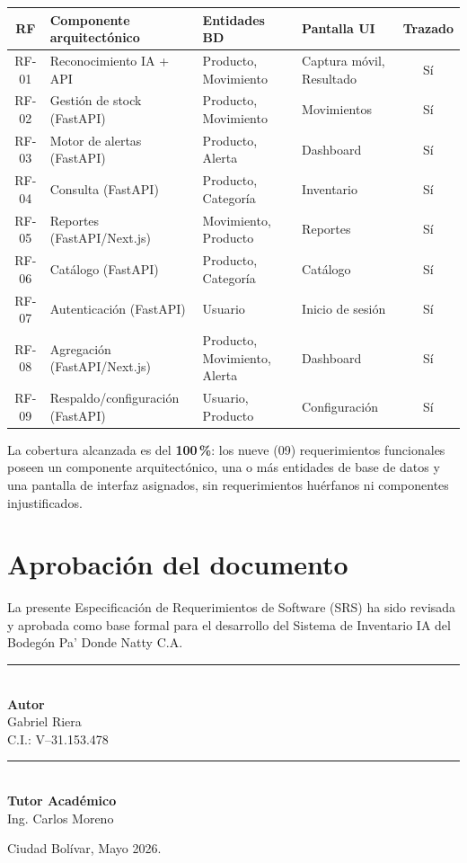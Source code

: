 \documentclass[12pt, letterpaper]{report}
\begin{document}
\scriptsize
\noindent
\begin{tabular}{|c|p{3.4cm}|p{3.0cm}|p{2.6cm}|c|}
\hline
\textbf{RF} & \textbf{Componente arquitectónico} & \textbf{Entidades BD} & \textbf{Pantalla UI} & \textbf{Trazado} \\
\hline
RF-01 & Reconocimiento IA + API & Producto, Movimiento & Captura móvil, Resultado & Sí \\
\hline
RF-02 & Gestión de stock (FastAPI) & Producto, Movimiento & Movimientos & Sí \\
\hline
RF-03 & Motor de alertas (FastAPI) & Producto, Alerta & Dashboard & Sí \\
\hline
RF-04 & Consulta (FastAPI) & Producto, Categoría & Inventario & Sí \\
\hline
RF-05 & Reportes (FastAPI/Next.js) & Movimiento, Producto & Reportes & Sí \\
\hline
RF-06 & Catálogo (FastAPI) & Producto, Categoría & Catálogo & Sí \\
\hline
RF-07 & Autenticación (FastAPI) & Usuario & Inicio de sesión & Sí \\
\hline
RF-08 & Agregación (FastAPI/Next.js) & Producto, Movimiento, Alerta & Dashboard & Sí \\
\hline
RF-09 & Respaldo/configuración (FastAPI) & Usuario, Producto & Configuración & Sí \\
\hline
\end{tabular}
\normalsize
{}

\vspace{8pt}

La cobertura alcanzada es del \textbf{100\,\%}: los nueve (09)
requerimientos funcionales poseen un componente arquitectónico, una o
más entidades de base de datos y una pantalla de interfaz asignados,
sin requerimientos huérfanos ni componentes injustificados.

\section*{Aprobación del documento}

La presente Especificación de Requerimientos de Software (SRS) ha sido
revisada y aprobada como base formal para el desarrollo del Sistema de
Inventario IA del Bodegón Pa' Donde Natty C.A.

\vspace{1.2cm}

\noindent
\begin{minipage}{0.45\textwidth}
\centering
\rule{5.5cm}{0.4pt}\\[4pt]
\textbf{Autor}\\
Gabriel Riera\\
C.I.: V--31.153.478
\end{minipage}\hfill
\begin{minipage}{0.45\textwidth}
\centering
\rule{5.5cm}{0.4pt}\\[4pt]
\textbf{Tutor Académico}\\
Ing. Carlos Moreno
\end{minipage}

\vspace{1cm}

\begin{center}
Ciudad Bolívar, Mayo 2026.
\end{center}

\end{document}
